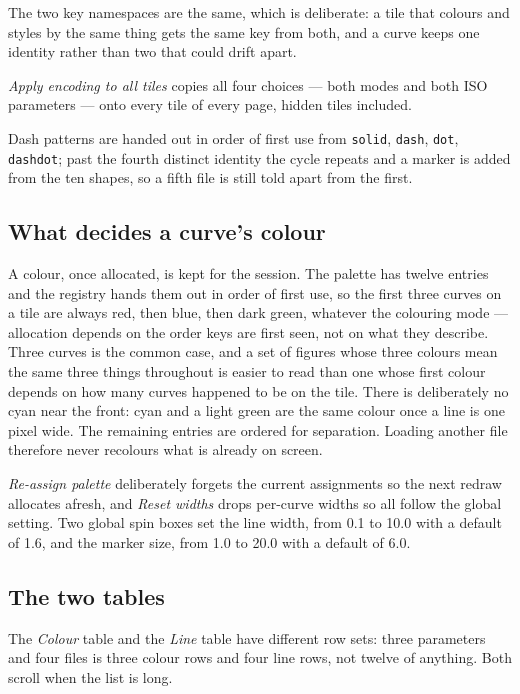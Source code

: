 \documentclass[11pt,a4paper,oneside]{report}
\newcommand{\code}[1]{\texttt{#1}}
\begin{document}
The two key namespaces are the same, which is deliberate: a tile that colours and
styles by the same thing gets the same key from both, and a curve keeps one
identity rather than two that could drift apart.

\emph{Apply encoding to all tiles} copies all four choices --- both modes and
both ISO parameters --- onto every tile of every page, hidden tiles included.

Dash patterns are handed out in order of first use from \code{solid},
\code{dash}, \code{dot}, \code{dashdot}; past the fourth distinct identity the
cycle repeats and a marker is added from the ten shapes, so a fifth file is
still told apart from the first.

\subsection{What decides a curve's colour}

A colour, once allocated, is kept for the session. The palette has twelve entries
and the registry hands them out in order of first use, so the first three curves
on a tile are always red, then blue, then dark green, whatever the colouring mode
--- allocation depends on the order keys are first seen, not on what they
describe. Three curves is the common case, and a set of figures whose three
colours mean the same three things throughout is easier to read than one whose
first colour depends on how many curves happened to be on the tile. There is
deliberately no cyan near the front: cyan and a light green are the same colour
once a line is one pixel wide. The remaining entries are ordered for separation.
Loading another file therefore never recolours what is already on screen.

\emph{Re-assign palette} deliberately forgets the current assignments so the next
redraw allocates afresh, and \emph{Reset widths} drops per-curve widths so all
follow the global setting. Two global spin boxes set the line width, from 0.1 to
10.0 with a default of 1.6, and the marker size, from 1.0 to 20.0 with a default
of 6.0.

\subsection{The two tables}

The \emph{Colour} table and the \emph{Line} table have different row sets:
three parameters and four files is three colour rows and four line rows, not
twelve of anything. Both scroll when the list is long.
\end{document}
